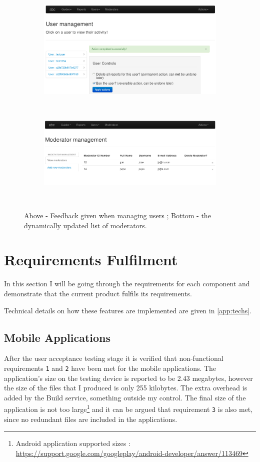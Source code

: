 \documentclass[12pt]{ecsproject}     %
\begin{document}
\begin{figure}
\centering
	\begin{subfigure}
	\centering	
	\includegraphics[scale=0.4]{usr-feedback-new.png}
	\end{subfigure}
	~
	\begin{subfigure}
	\centering	
	\includegraphics[scale=0.4]{mod.png}
	\end{subfigure}
	~
	\caption{Above - Feedback given when managing users ; Bottom - the dynamically updated list of moderators.}	
\label{fig:usrmod}
\end{figure}


\section{Requirements Fulfilment}
In this section I will be going through the requirements for each component and demonstrate that the current product fulfils its requirements.

Technical details on how these features are implemented are given in \ref{app:techs}.
\subsection{Mobile Applications}
After the user acceptance testing stage it is verified that non-functional requirements \texttt{1} and \texttt{2} have been met for the mobile applications. The application's size on the testing device is reported to be 2.43 megabytes, however the size of the files that I produced is only 255 kilobytes. The extra overhead is added by the Build service, something outside my control. The final size of the application is not too large\footnote{Android application supported sizes : \href{https://support.google.com/googleplay/android-developer/answer/113469}{https://support.google.com/googleplay/android-developer/answer/113469}} and it can be argued that requirement \texttt{3} is also met, since no redundant files are included in the applications.
\end{document}
